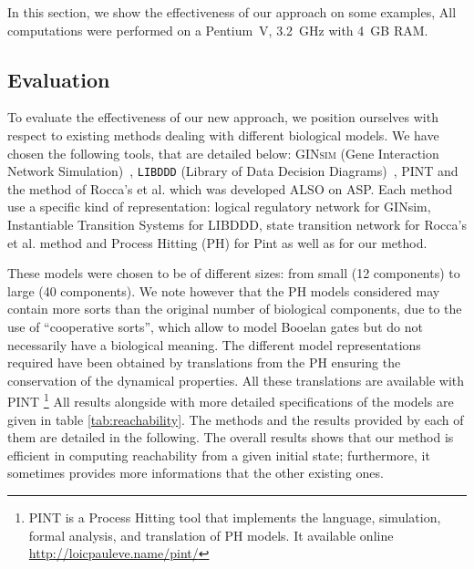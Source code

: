 In this section, we show the effectiveness of our approach on some examples,
%
All computations were performed on a Pentium~V, 3.2~GHz with 4~GB RAM.

\subsection{Evaluation}
To evaluate the effectiveness of our new approach,
we position ourselves with respect to existing methods dealing with different biological models.
We have chosen the following tools, that are detailed below: 
\textsc{GINsim} (Gene Interaction Network Simulation)~\cite{gonzalez2006ginsim,naldi2009logical,naldi2007decision},
\texttt{LIBDDD} (Library of Data Decision Diagrams)~\cite{thierry2009hierarchical,colange2013towards},  PINT \cite{PMR12-MSCS} and the method of Rocca's et al. \cite{roccaasp} which was developed ALSO on ASP.
 
 
Each method use a specific kind of representation:
logical regulatory network for GINsim,
Instantiable Transition Systems for LIBDDD,
state transition network for Rocca's et al. method
and Process Hitting (PH) for Pint as well as for our method.

%
These models were chosen to be of different sizes:
from small (12 components) to large (40 components).
We note however that the PH models considered may contain more sorts than
the original number of biological components, due to the use of
“cooperative sorts”, which allow to model Booelan gates but do not necessarily
have a biological meaning.
The different model representations required have been obtained by translations
from the PH
ensuring the conservation of the dynamical properties.
All these translations are available with \textsc{PINT} \footnote{\textsc{PINT} is a Process Hitting tool that implements the language, simulation, formal analysis, and translation of PH models. It available online \url{http://loicpauleve.name/pint/} }
All results alongside with more detailed specifications of the models
are given in table \ref{tab:reachability}.
The methods and the results provided by each of them are detailed in the following.
The overall results shows that our method is efficient in computing reachability
from a given initial state;
furthermore, it sometimes provides more informations that the other existing ones.

